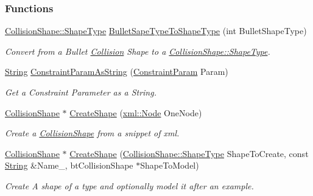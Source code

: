 \subsubsection*{Functions}
\begin{DoxyCompactItemize}
\item 
\hyperlink{classMezzanine_1_1CollisionShape_ad04186055565998879b64176d6dd100d}{CollisionShape::ShapeType} \hyperlink{namespaceMezzanine_af007af1ad839d251e61e95488ab78876}{BulletSapeTypeToShapeType} (int BulletShapeType)
\begin{DoxyCompactList}\small\item\em Convert from a Bullet \hyperlink{classMezzanine_1_1Collision}{Collision} Shape to a \hyperlink{classMezzanine_1_1CollisionShape_ad04186055565998879b64176d6dd100d}{CollisionShape::ShapeType}. \item\end{DoxyCompactList}\item 
\hyperlink{namespaceMezzanine_acf9fcc130e6ebf08e3d8491aebcf1c86}{String} \hyperlink{namespaceMezzanine_a11080ec435c80a89d4da498ea8049c3e}{ConstraintParamAsString} (\hyperlink{namespaceMezzanine_a6c62e8c2938fb203eb7a7072c12176f4}{ConstraintParam} Param)
\begin{DoxyCompactList}\small\item\em Get a Constraint Parameter as a String. \item\end{DoxyCompactList}\item 
\hyperlink{classMezzanine_1_1CollisionShape}{CollisionShape} $\ast$ \hyperlink{namespaceMezzanine_a3b5904fe847274e3bd0d6a1b39cbed02}{CreateShape} (\hyperlink{classMezzanine_1_1xml_1_1Node}{xml::Node} OneNode)
\begin{DoxyCompactList}\small\item\em Create a \hyperlink{classMezzanine_1_1CollisionShape}{CollisionShape} from a snippet of xml. \item\end{DoxyCompactList}\item 
\hyperlink{classMezzanine_1_1CollisionShape}{CollisionShape} $\ast$ \hyperlink{namespaceMezzanine_a945376a411966f62fad3f13e14550d74}{CreateShape} (\hyperlink{classMezzanine_1_1CollisionShape_ad04186055565998879b64176d6dd100d}{CollisionShape::ShapeType} ShapeToCreate, const \hyperlink{namespaceMezzanine_acf9fcc130e6ebf08e3d8491aebcf1c86}{String} \&Name\_\-, btCollisionShape $\ast$ShapeToModel)
\begin{DoxyCompactList}\small\item\em Create A shape of a type and optionally model it after an example. \item\end{DoxyCompactList}\item 

\end{DoxyCompactItemize}
